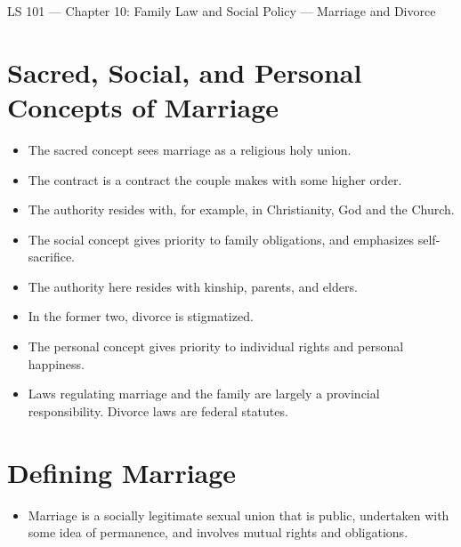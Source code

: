 \documentclass{article}
\author{Clement Tsang}
\begin{document}
\begin{center}
    \Large{LS 101 --- Chapter 10: Family Law and Social Policy --- Marriage and Divorce}
\end{center}

\section{Sacred, Social, and Personal Concepts of Marriage}
\begin{itemize}
    \item The sacred concept sees marriage as a religious holy union.
    \item The contract is a contract the couple makes with some higher order.
    \item The authority resides with, for example, in Christianity, God and the Church.
    \item The social concept gives priority to family obligations, and emphasizes self-sacrifice.
    \item The authority here resides with kinship, parents, and elders.
    \item In the former two, divorce is stigmatized.
    \item The personal concept gives priority to individual rights and personal happiness.
    \item Laws regulating marriage and the family are largely a provincial responsibility.  Divorce laws are federal statutes.
\end{itemize}

\section{Defining Marriage}
\begin{itemize}
    \item Marriage is a socially legitimate sexual union that is public, undertaken with some idea of permanence, and involves mutual rights and obligations.
\end{itemize}
\end{document}
